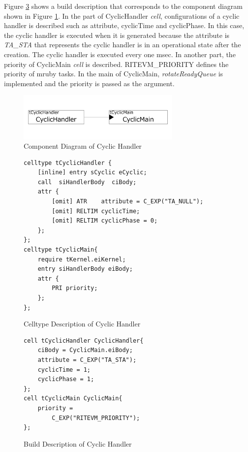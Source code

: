 \documentclass[conference,compsoc]{IEEEtran}
\begin{document}
Figure \ref{build_cyclic_handler} shows a build description that corresponds to the component diagram shown in Figure \ref{fig:cyclic_handler}.
In the part of CyclicHandler {\it cell}, configurations of a cyclic handler is described such as attribute, cyclicTime and cyclicPhase.
In this case, the cyclic handler is executed when it is generated because the attribute is {\it TA\_STA} that represents the cyclic handler is in an operational state after the creation.
The cyclic handler is executed every one msec.
In another part, the priority of CyclicMain {\it cell} is described.
RITEVM\_PRIORITY defines the priority of mruby tasks.
In the main of CyclicMain, {\it rotateReadyQueue} is implemented and the priority is passed as the argument.

\begin{figure}[t]
    \centering
    \includegraphics[width=8cm,clip]{figure/cyclic_handler.pdf}
    \caption{Component Diagram of Cyclic Handler}
    \label{fig:cyclic_handler}
\end{figure}
\begin{figure}[t]
    \centering
    \begin{lstlisting}
celltype tCyclicHandler {
    [inline] entry sCyclic eCyclic;
    call  siHandlerBody  ciBody;
    attr {
    	[omit] ATR    attribute = C_EXP("TA_NULL");
    	[omit] RELTIM cyclicTime;
    	[omit] RELTIM cyclicPhase = 0;
    };
};
celltype tCyclicMain{
    require tKernel.eiKernel;
    entry siHandlerBody eiBody;
    attr {
        PRI priority;
    };
};
    \end{lstlisting}
    \caption{Celltype Description of Cyclic Handler}
    \label{celltype_cyclic_handler}
\end{figure}
\begin{figure}[t]
    \centering
    \begin{lstlisting}
cell tCyclicHandler CyclicHandler{
    ciBody = CyclicMain.eiBody;
    attribute = C_EXP("TA_STA");
    cyclicTime = 1;
    cyclicPhase = 1;
};
cell tCyclicMain CyclicMain{
    priority =
        C_EXP("RITEVM_PRIORITY");
};
   \end{lstlisting}
    \caption{Build Description of Cyclic Handler}
    \label{build_cyclic_handler}
\end{figure}
 
\end{document}
